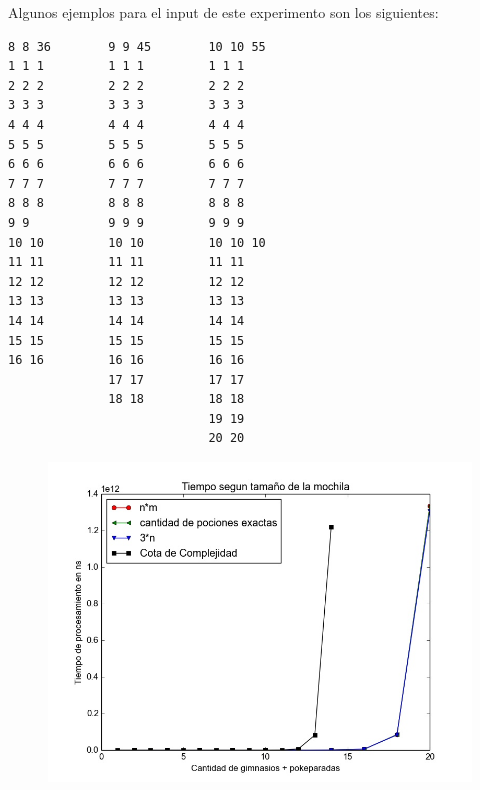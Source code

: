       Algunos ejemplos para el input de este experimento son los siguientes:


 \begin{codesnippet}
            \begin{verbatim}
8 8 36        9 9 45        10 10 55
1 1 1         1 1 1         1 1 1
2 2 2         2 2 2         2 2 2
3 3 3         3 3 3         3 3 3
4 4 4         4 4 4         4 4 4
5 5 5         5 5 5         5 5 5
6 6 6         6 6 6         6 6 6
7 7 7         7 7 7         7 7 7
8 8 8         8 8 8         8 8 8
9 9           9 9 9         9 9 9
10 10         10 10         10 10 10
11 11         11 11         11 11
12 12         12 12         12 12
13 13         13 13         13 13
14 14         14 14         14 14
15 15         15 15         15 15
16 16         16 16         16 16
              17 17         17 17
              18 18         18 18
                            19 19
                            20 20

\end{verbatim}
            \end{codesnippet}

  
  \begin{figure}[H]
      \begin{center}
        \includegraphics[width=0.7\columnwidth]{imagenes/exp1_ej1.jpeg}
        \caption{}
      \end{center}
  \end{figure}


